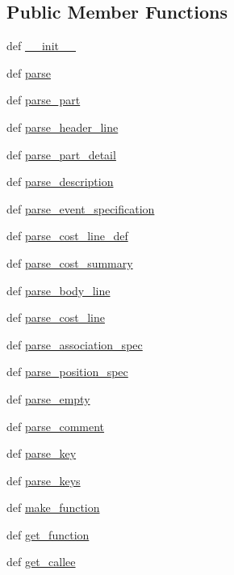 \subsection*{Public Member Functions}
\begin{DoxyCompactItemize}
\item 
def \hyperlink{classgprof2dot_1_1CallgrindParser_a05844f0101a68e1f532064b78f5e2dfa}{\_\-\_\-init\_\-\_\-}
\item 
def \hyperlink{classgprof2dot_1_1CallgrindParser_ad5ef0ee6f7e2c0987f49452ef1488ea0}{parse}
\item 
def \hyperlink{classgprof2dot_1_1CallgrindParser_a166c364691bdfc631658e2d8d44207ae}{parse\_\-part}
\item 
def \hyperlink{classgprof2dot_1_1CallgrindParser_af374e0f657409ad7cd105f7aae5fcf22}{parse\_\-header\_\-line}
\item 
def \hyperlink{classgprof2dot_1_1CallgrindParser_a8cfe8d654d63be805492d5fcfcc981c9}{parse\_\-part\_\-detail}
\item 
def \hyperlink{classgprof2dot_1_1CallgrindParser_ae6400928371af8dde77bf0781c7a0e64}{parse\_\-description}
\item 
def \hyperlink{classgprof2dot_1_1CallgrindParser_ae3af3ac1f897f439ec133b283a9471af}{parse\_\-event\_\-specification}
\item 
def \hyperlink{classgprof2dot_1_1CallgrindParser_a5ed9361ca6523750266321cfd9cb6cb8}{parse\_\-cost\_\-line\_\-def}
\item 
def \hyperlink{classgprof2dot_1_1CallgrindParser_a2fdb90e13dc60949beecdc3e24f08614}{parse\_\-cost\_\-summary}
\item 
def \hyperlink{classgprof2dot_1_1CallgrindParser_a74fe82afe9a469adea0dd5c8847370b7}{parse\_\-body\_\-line}
\item 
def \hyperlink{classgprof2dot_1_1CallgrindParser_a206aecc896d7c1f80fe5726d32eff675}{parse\_\-cost\_\-line}
\item 
def \hyperlink{classgprof2dot_1_1CallgrindParser_a5798c71d43205ef6221ccd1b68482208}{parse\_\-association\_\-spec}
\item 
def \hyperlink{classgprof2dot_1_1CallgrindParser_a43de4d71d555469b7b50ee32d863dba6}{parse\_\-position\_\-spec}
\item 
def \hyperlink{classgprof2dot_1_1CallgrindParser_a81563826fed7fcd84d84f8cbf1e160a3}{parse\_\-empty}
\item 
def \hyperlink{classgprof2dot_1_1CallgrindParser_aa5e679c2a5cf0a55f7aec259b99382fe}{parse\_\-comment}
\item 
def \hyperlink{classgprof2dot_1_1CallgrindParser_a2a304d826b3709be02c59a516394ea59}{parse\_\-key}
\item 
def \hyperlink{classgprof2dot_1_1CallgrindParser_abee36a4e9fb2d7c30c665c1d9ecc9b85}{parse\_\-keys}
\item 
def \hyperlink{classgprof2dot_1_1CallgrindParser_a50a9d358d6c29e9095fc41b38dd7755d}{make\_\-function}
\item 
def \hyperlink{classgprof2dot_1_1CallgrindParser_ada28bfb3b8364c2c39b2950b80abede5}{get\_\-function}
\item 
def \hyperlink{classgprof2dot_1_1CallgrindParser_a029c12d696c614aa8fa0c57a3b040ba2}{get\_\-callee}
\end{DoxyCompactItemize}
